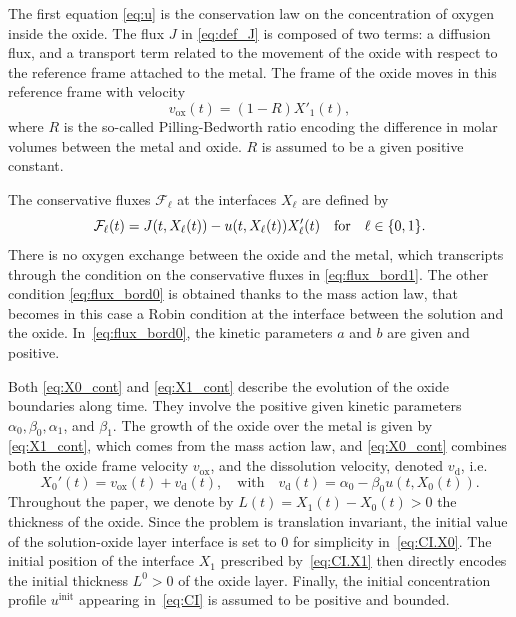 \documentclass{amsart}
\newcommand\Flux{\mathcal{F}}
\begin{document}
The first equation \eqref{eq:u} is the conservation law on the concentration of oxygen inside the oxide. The flux $J$ in \eqref{eq:def_J} is composed of two terms: a diffusion flux, and a transport term related to the movement of the oxide with respect to the reference frame attached to the metal. The frame of the oxide moves in this reference frame with velocity 
\[
v_\text{ox}(t) = (1 - R) X'_1(t),
\] where $R$ is the so-called Pilling-Bedworth ratio encoding the difference in molar volumes between the metal and oxide. $R$ is assumed to be a given positive constant.

The conservative fluxes $\mathcal{F}_\ell$ at the interfaces $X_\ell$ are defined by 
	\begin{equation} \label{eq:rel_flux}
		\Flux_\ell(t) = J(t, X_\ell(t)) - u(t, X_\ell(t))X'_\ell(t) \quad \textnormal{for} \quad \ell \in \{0,1\}.
	\end{equation}
There is no oxygen exchange between the oxide and the metal, which transcripts through the condition on the conservative fluxes in \eqref{eq:flux_bord1}. The other condition \eqref{eq:flux_bord0} is obtained thanks to the mass action law, that becomes in this case a Robin condition at the interface between the solution and the oxide. In~\eqref{eq:flux_bord0}, the kinetic parameters $a$ and $b$ are given and positive.

Both \eqref{eq:X0_cont} and \eqref{eq:X1_cont} describe the evolution of the oxide boundaries along time. They involve the positive given kinetic parameters $\alpha_0, \beta_0, \alpha_1$, and $\beta_1$. The growth of the oxide over the metal is given by \eqref{eq:X1_cont}, which comes from the mass action law, and \eqref{eq:X0_cont} combines both the oxide frame velocity $v_\text{ox}$, and the dissolution velocity, denoted $v_\text{d}$, i.e. 
\[
X_0'(t) = v_\text{ox}(t) + v_\text{d}(t), \quad \text{with} \quad
v_\text{d}(t) = \alpha_0 - \beta_0 u(t, X_0(t)).
\]
Throughout the paper, we denote by $L(t) = X_1(t) - X_0(t) >0$ the thickness of the oxide. 
Since the problem is translation invariant, the initial value of the solution-oxide layer interface is set to 0 for simplicity in~\eqref{eq:CI.X0}. 
The initial position of the interface $X_1$ prescribed by~\eqref{eq:CI.X1} then directly encodes the initial thickness $L^0>0$ of the oxide layer. 
Finally, the initial concentration profile $u^\text{init}$ appearing in~\eqref{eq:CI} is assumed to be positive and bounded.

\end{document}
